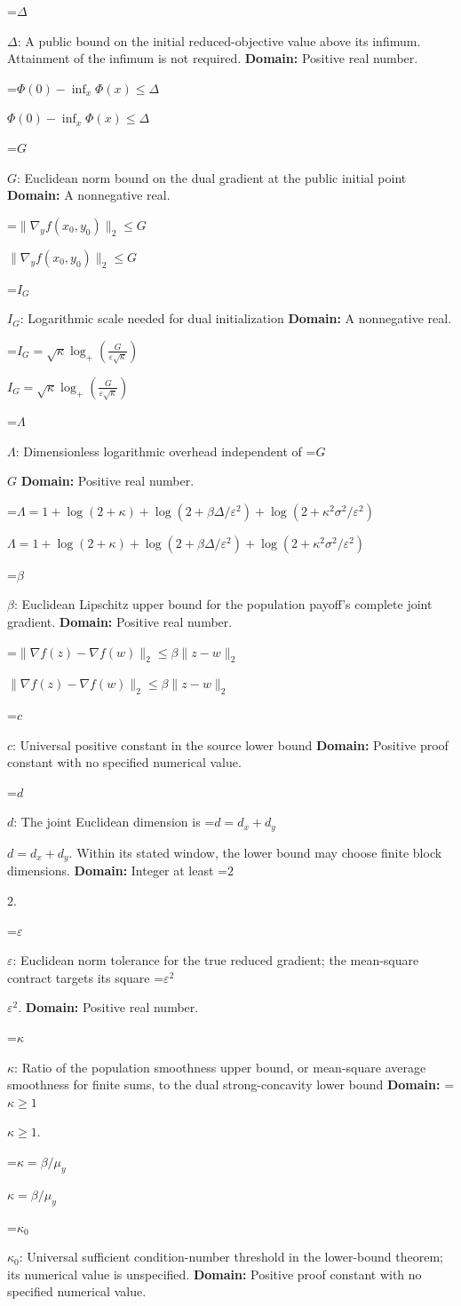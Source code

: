 \documentclass[10pt,a4paper]{article}
\newcommand{\AtlasMath}[1]{\par\begingroup\centering\setbox0=\hbox{$\displaystyle #1$}\ifdim\wd0>1.4\linewidth\typeout{ATLAS WIDE FORMULA: \the\wd0}\fi\ifdim\wd0>\linewidth\resizebox{\linewidth}{!}{\box0}\else\box0\fi\par\endgroup}
\newcommand{\AtlasInlineMath}[1]{\begingroup\setbox0=\hbox{$#1$}\ifdim\wd0>.4\linewidth\endgroup\AtlasMath{#1}\else\endgroup$#1$\fi}
\begin{document}
\AtlasInlineMath{\Delta}: A public bound on the initial reduced-objective value above its infimum. Attainment of the infimum is not required. \textbf{Domain:} Positive real number.

\AtlasInlineMath{\Phi(0)-\inf_x\Phi(x)\le\Delta}

\AtlasInlineMath{G}: Euclidean norm bound on the dual gradient at the public initial point \textbf{Domain:} A nonnegative real.

\AtlasInlineMath{\|\nabla_yf(x_0,y_0)\|_2\le G}

\AtlasInlineMath{I_G}: Logarithmic scale needed for dual initialization \textbf{Domain:} A nonnegative real.

\AtlasInlineMath{I_G=\sqrt\kappa\log_+\!\left(\frac{G}{\varepsilon\sqrt\kappa}\right)}

\AtlasInlineMath{\Lambda}: Dimensionless logarithmic overhead independent of \AtlasInlineMath{G} \textbf{Domain:} Positive real number.

\AtlasInlineMath{\Lambda=1+\log(2+\kappa)+\log(2+\beta\Delta/\varepsilon^2)+\log(2+\kappa^2\sigma^2/\varepsilon^2)}

\AtlasInlineMath{\beta}: Euclidean Lipschitz upper bound for the population payoff's complete joint gradient. \textbf{Domain:} Positive real number.

\AtlasInlineMath{\|\nabla f(z)-\nabla f(w)\|_2\le\beta\|z-w\|_2}

\AtlasInlineMath{c}: Universal positive constant in the source lower bound \textbf{Domain:} Positive proof constant with no specified numerical value.

\AtlasInlineMath{d}: The joint Euclidean dimension is \AtlasInlineMath{d=d_x+d_y}. Within its stated window, the lower bound may choose finite block dimensions. \textbf{Domain:} Integer at least \AtlasInlineMath{2}.

\AtlasInlineMath{\varepsilon}: Euclidean norm tolerance for the true reduced gradient; the mean-square contract targets its square \AtlasInlineMath{\varepsilon^2}. \textbf{Domain:} Positive real number.

\AtlasInlineMath{\kappa}: Ratio of the population smoothness upper bound, or mean-square average smoothness for finite sums, to the dual strong-concavity lower bound \textbf{Domain:} \AtlasInlineMath{\kappa\ge1}.

\AtlasInlineMath{\kappa=\beta/\mu_y}

\AtlasInlineMath{\kappa_0}: Universal sufficient condition-number threshold in the lower-bound theorem; its numerical value is unspecified. \textbf{Domain:} Positive proof constant with no specified numerical value.
\end{document}
